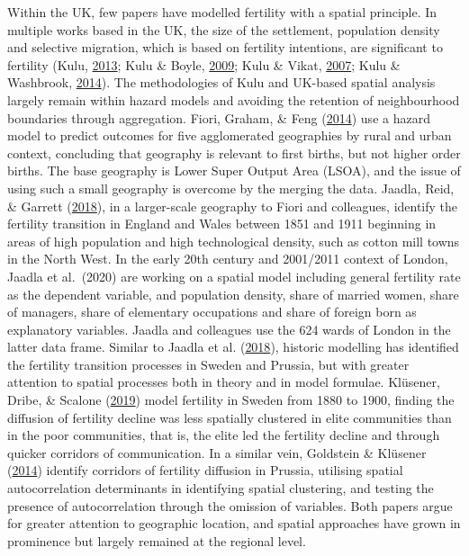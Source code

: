 \documentclass[12pt,twoside]{reedthesis}
\begin{document}
Within the UK, few papers have modelled fertility with a spatial principle. In multiple works based in the UK, the size of the settlement, population density and selective migration, which is based on fertility intentions, are significant to fertility (Kulu, \protect\hyperlink{ref-kulu2013}{2013}; Kulu \& Boyle, \protect\hyperlink{ref-kulu2009}{2009}; Kulu \& Vikat, \protect\hyperlink{ref-kulu2007}{2007}; Kulu \& Washbrook, \protect\hyperlink{ref-kulu2014}{2014}). The methodologies of Kulu and UK-based spatial analysis largely remain within hazard models and avoiding the retention of neighbourhood boundaries through aggregation. Fiori, Graham, \& Feng (\protect\hyperlink{ref-fiori2014}{2014}) use a hazard model to predict outcomes for five agglomerated geographies by rural and urban context, concluding that geography is relevant to first births, but not higher order births. The base geography is Lower Super Output Area (LSOA), and the issue of using such a small geography is overcome by the merging the data. Jaadla, Reid, \& Garrett (\protect\hyperlink{ref-jaadla2018}{2018}), in a larger-scale geography to Fiori and colleagues, identify the fertility transition in England and Wales between 1851 and 1911 beginning in areas of high population and high technological density, such as cotton mill towns in the North West. In the early 20th century and 2001/2011 context of London, Jaadla et al.~(2020) are working on a spatial model including general fertility rate as the dependent variable, and population density, share of married women, share of managers, share of elementary occupations and share of foreign born as explanatory variables. Jaadla and colleagues use the 624 wards of London in the latter data frame. Similar to Jaadla et al. (\protect\hyperlink{ref-jaadla2018}{2018}), historic modelling has identified the fertility transition processes in Sweden and Prussia, but with greater attention to spatial processes both in theory and in model formulae. Klüsener, Dribe, \& Scalone (\protect\hyperlink{ref-klusener2019}{2019}) model fertility in Sweden from 1880 to 1900, finding the diffusion of fertility decline was less spatially clustered in elite communities than in the poor communities, that is, the elite led the fertility decline and through quicker corridors of communication. In a similar vein, Goldstein \& Klüsener (\protect\hyperlink{ref-goldstein2014}{2014}) identify corridors of fertility diffusion in Prussia, utilising spatial autocorrelation determinants in identifying spatial clustering, and testing the presence of autocorrelation through the omission of variables. Both papers argue for greater attention to geographic location, and spatial approaches have grown in prominence but largely remained at the regional level.
\end{document}
